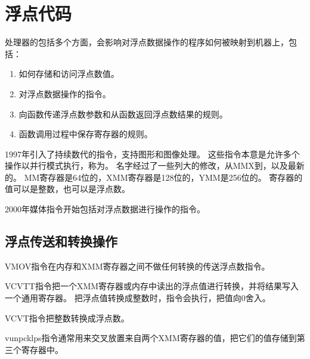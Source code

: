 
\section{浮点代码}
{
    处理器的包括多个方面，会影响对浮点数据操作的程序如何被映射到机器上，包括：

    \begin{enumerate}
        \item 如何存储和访问浮点数值。
        \item 对浮点数据操作的指令。
        \item 向函数传递浮点数参数和从函数返回浮点数结果的规则。
        \item 函数调用过程中保存寄存器的规则。
    \end{enumerate}

    1997年引入了持续数代的指令，支持图形和图像处理。
    这些指令本意是允许多个操作以并行模式执行，称为。
    名字经过了一些列大的修改，从MMX到，以及最新的。
    MM寄存器是64位的，XMM寄存器是128位的，YMM是256位的。
    寄存器的值可以是整数，也可以是浮点数。

    2000年媒体指令开始包括对浮点数据进行操作的指令。

    \subsection{浮点传送和转换操作}
    {
        VMOV指令在内存和XMM寄存器之间不做任何转换的传送浮点数指令。

        VCVTT指令把一个XMM寄存器或内存中读出的浮点值进行转换，并将结果写入一个通用寄存器。
        把浮点值转换成整数时，指令会执行，把值向0舍入。

        VCVT指令把整数转换成浮点数。

        vunpcklps指令通常用来交叉放置来自两个XMM寄存器的值，把它们的值存储到第三个寄存器中。
    }
}
